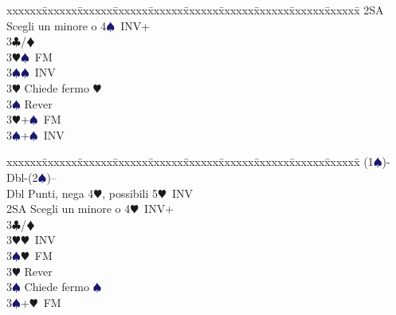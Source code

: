 \documentclass[a4paper,italian]{article}
\newcommand{\BC}{\textcolor{OliveGreen}{$\clubsuit$}}
\newcommand{\BD}{\textcolor{RedOrange}{$\vardiamondsuit$}}
\newcommand{\BH}{\textcolor{Red2}{$\varheartsuit${}}}
\newcommand{\BS}{\textcolor{MidnightBlue}{$\spadesuit${}}}
\newenvironment{bidtable}
{\begin{tabbing}

    xxxxxx\=xxxxxx\=xxxxxx\=xxxxxx\=xxxxxx\=xxxxxx\=xxxxxx\=xxxxxx\=xxxxxx\=xxxxxx\=\kill}
{\end{tabbing} }%
\begin{document}
\begin{multicols}{2}
\begin{bidtable}
                                            2SA \> Scegli un minore o 4\BS\ INV+\+\\
                                            3\BC/\BD\+\\
                                            3\BH {}\BS\ FM\\
                                            3\BS {}\BS\ INV\-\\
                                            3\BH \> Chiede fermo \BH\\
                                            3\BS \> Rever\-\\
                                            3\BH {}+\BS\ FM\\
                                            3\BS {}+\BS\ INV\\
                                        \end{bidtable}
                                        \begin{bidtable}
                                            (1\BS)-Dbl-(2\BS)--\\
                                            Dbl\> Punti, nega 4\BH, possibili 5\BH\ INV\\
                                            2SA \> Scegli un minore o 4\BH\ INV+\+\\
                                            3\BC/\BD\+\\
                                            3\BH {}\BH\ INV\\
                                            3\BS {}\BH\ FM\-\\
                                            3\BH \> Rever\\
                                            3\BS \> Chiede fermo \BS\-\\
                                            3\BS {}+\BH\ FM
                                        \end{bidtable}

\end{multicols}
\end{document}
